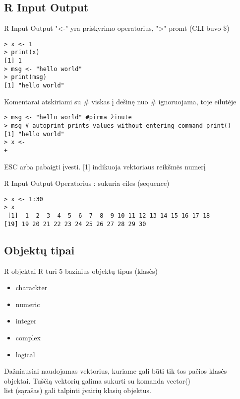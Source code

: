 \documentclass[11pt,xcolor=table]{beamer}
\begin{document}
\subsection{R Input Output}


\begin{frame}[fragile]{R Input Output}
"<-" yra priskyrimo operatorius, ">" promt (CLI buvo \$)
\begin{lstlisting}
> x <- 1
> print(x)
[1] 1
> msg <- "hello world"
> print(msg)
[1] "hello world"
\end{lstlisting}

Komentarai atskiriami su \# viskas į dešinę nuo \# ignoruojama, toje eilutėje
\begin{lstlisting}
> msg <- "hello world" #pirma žinute
> msg # autoprint prints values without entering command print()
[1] "hello world"
> x <- 
+ 
\end{lstlisting}
ESC arba pabaigti įvesti. [1] indikuoja vektoriaus reikšmės numerį
\end{frame}


\begin{frame}[fragile]{R Input Output}
Operatorius : sukuria eiles (sequence)
\begin{lstlisting}
> x <- 1:30
> x
 [1]  1  2  3  4  5  6  7  8  9 10 11 12 13 14 15 16 17 18
[19] 19 20 21 22 23 24 25 26 27 28 29 30
\end{lstlisting}
\end{frame}
\subsection{Objektų tipai}

\begin{frame}[fragile]{R objektai}
R turi 5 bazinius objektų tipus (klasės)
\begin{itemize}
\item charackter 
\item numeric
\item integer
\item complex
\item logical
\end{itemize}
Dažniausiai naudojamas vektorius, kuriame gali būti tik tos pačios klasės objektai. Tuščią vektorių galima sukurti su komanda vector()\\
list (sąrašas) gali talpinti įvairių klasių objektus.
\end{frame}
\end{document}

